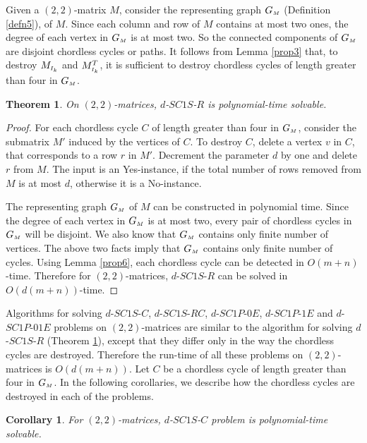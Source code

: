 \documentclass[review, 1p]{elsarticle}
\newtheorem{theorem}{Theorem}
\newtheorem{corollary}{Corollary}
\begin{document}
 Given a $(2, 2)$-matrix $M$, consider the representing graph $G_{\mathsmaller{M}}$ (Definition \ref{defn5}), of $M$. Since each column and row of $M$ contains at most two ones, the degree of each vertex in $G_{\mathsmaller{M}}$ is at most two. So the connected components of $G_{\mathsmaller{M}}$ are disjoint chordless cycles or paths. It follows from Lemma \ref{prop3} that, to destroy $M_{\mathsmaller I_{k}}$ and $M^{T}_{\mathsmaller{I_{k}}}$, it is sufficient to destroy chordless cycles of length greater than four in $G_{\mathsmaller{M}}$.
\begin{theorem}\label{easily}
On $(2,2)$-matrices, $d$-$SC1S$-$R$ is polynomial-time solvable.
\end{theorem}
\begin{proof}
  For each chordless cycle $C$ of length greater than four in $G_{\mathsmaller{M}}$, consider the submatrix $M'$ induced by the vertices of $C$. To destroy $C$, delete a vertex $v$ in $C$, that corresponds to a row $r$ in $M'$. Decrement the parameter $d$ by one and delete $r$ from $M$. The input is an Yes-instance, if the total number of rows removed from $M$ is at most $d$, otherwise it is a No-instance.
  
The representing graph $G_{\mathsmaller{M}}$ of $M$ can be constructed in polynomial time. Since the degree of each vertex in $G_{\mathsmaller{M}}$ is at most two, every pair of chordless cycles in $G_{\mathsmaller{M}}$ will be disjoint. We also know that $G_{\mathsmaller{M}}$ contains only finite number of vertices. The above two facts imply that $G_{\mathsmaller{M}}$ contains only finite number of cycles. Using Lemma \ref{prop6}, each chordless cycle can be detected in $O(m + n)$-time. Therefore for $(2,2)$-matrices, $d$-$SC1S$-$R$ can be solved in $O(d(m + n))$-time.
\end{proof}
 Algorithms for solving $d$-$SC1S$-$C$, $d$-$SC1S$-$RC$, $d$-$SC1P$-$0E$, $d$-$SC1P$-$1E$ and $d$-$SC1P$-$01E$ problems on $(2,2)$-matrices are similar to the algorithm for solving $d$-$SC1S$-$R$ (Theorem \ref{easily}), except that they differ only in the way the chordless cycles are destroyed. Therefore the run-time of all these problems on $(2,2)$-matrices is $O(d(m + n))$. Let $C$ be a chordless cycle of length greater than four in $G_{\mathsmaller{M}}$. In the following corollaries, we describe how the chordless cycles are destroyed in each of the problems.
\begin{corollary} 
For $(2,2)$-matrices, $d$-$SC1S$-$C$ problem is polynomial-time solvable.
\end{corollary}
\end{document}
